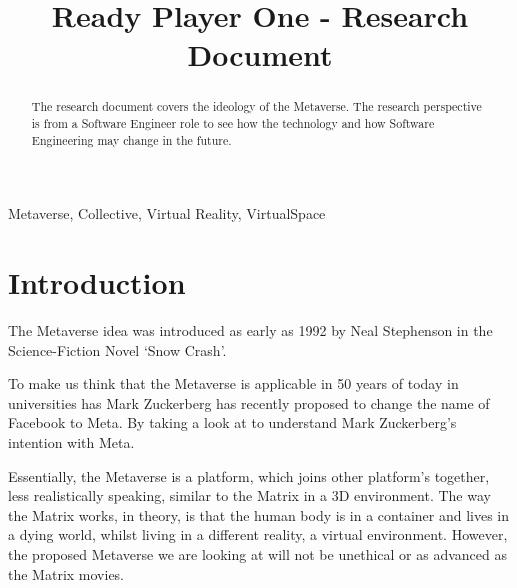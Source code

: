 \documentclass[conference]{IEEEtran}
\begin{document}
	\title{Ready Player One - Research Document}

	\author{
	}

     \maketitle
    
    \thispagestyle{plain}
    \pagestyle{plain}
    
    \tableofcontents
	  \vspace{.5cm}
    \begin{abstract}
      The research document covers the ideology of the Metaverse. The research perspective is from a Software Engineer role to see how the technology and how Software Engineering may change in the future.
    \end{abstract}

    \begin{IEEEkeywords}
      Metaverse, Collective, Virtual Reality, VirtualSpace
    \end{IEEEkeywords}

    \section{Introduction}
      The Metaverse idea was introduced as early as 1992 by Neal Stephenson in the Science-Fiction Novel `Snow Crash'. %
        
      To make us think that the Metaverse is applicable in 50 years of today in universities has Mark Zuckerberg has recently proposed to change the name of Facebook to Meta. By taking a look at %
      to understand Mark Zuckerberg's intention with Meta.

      Essentially, the Metaverse is a platform, which joins other platform's together, less realistically speaking, similar to the Matrix in a 3D environment. The way the Matrix works, in theory, is that the human body is in a container and lives in a dying world, whilst living in a different reality, a virtual environment. However, the proposed Metaverse we are looking at will not be unethical or as advanced as the Matrix movies.
\end{document}
